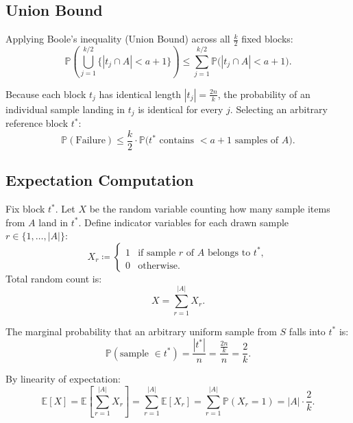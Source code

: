 \subsection{Union Bound}
Applying Boole's inequality (Union Bound) across all $\frac{k}{2}$ fixed blocks:
\begin{equation}
  \mathbb{P}\left(\bigcup_{j=1}^{k/2} \big\{|t_j \cap A| < a + 1\big\}\right) \le \sum_{j=1}^{k/2} \mathbb{P}\big(|t_j \cap A| < a + 1\big).
\end{equation}

Because each block $t_j$ has identical length $|t_j| = \frac{2n}{k}$, the probability of an individual sample landing in $t_j$ is identical for every $j$. Selecting an arbitrary reference block $t^*$:
\begin{equation}
  \mathbb{P}(\text{Failure}) \le \frac{k}{2} \cdot \mathbb{P}\big(t^* \text{ contains } < a + 1 \text{ samples of } A\big).
  \label{eq:union-bound-failure}
\end{equation}

\subsection{Expectation Computation}
Fix block $t^*$. Let $X$ be the random variable counting how many sample items from $A$ land in $t^*$. Define indicator variables for each drawn sample $r \in \{1, \dots, |A|\}$:
\begin{equation}
  X_r \coloneqq \begin{cases}
    1 & \text{if sample } r \text{ of } A \text{ belongs to } t^*, \\
    0 & \text{otherwise.}
  \end{cases}
\end{equation}
Total random count is:
\begin{equation}
  X = \sum_{r=1}^{|A|} X_r.
\end{equation}

The marginal probability that an arbitrary uniform sample from $S$ falls into $t^*$ is:
\begin{equation}
  \mathbb{P}(\text{sample } \in t^*) = \frac{|t^*|}{n} = \frac{\frac{2n}{k}}{n} = \frac{2}{k}.
\end{equation}

By linearity of expectation:
\begin{equation}
  \mathbb{E}[X] = \mathbb{E}\left[ \sum_{r=1}^{|A|} X_r \right] = \sum_{r=1}^{|A|} \mathbb{E}[X_r] = \sum_{r=1}^{|A|} \mathbb{P}(X_r = 1) = |A| \cdot \frac{2}{k}.
\end{equation}

